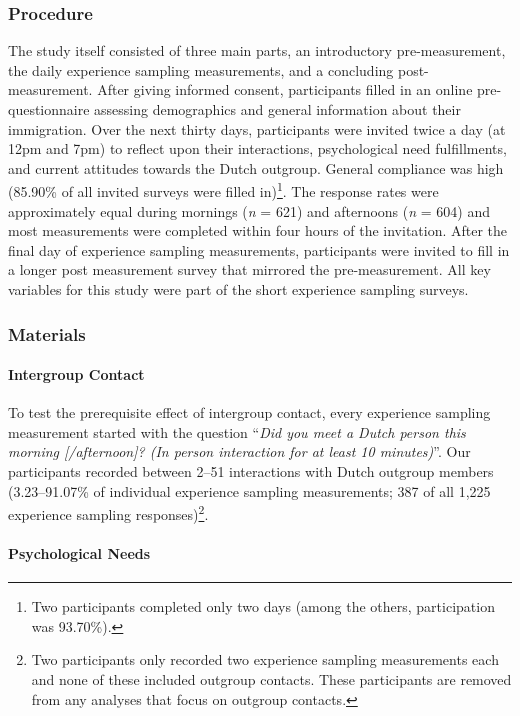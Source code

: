 \documentclass[man, 12pt, a4paper, mask]{apa7}
\theoremstyle{break}
\theoremstyle{plain}
\begin{document}
\subsubsection{Procedure}

The study itself consisted of three main parts, an introductory
pre-measurement, the daily experience sampling measurements, and a
concluding post-measurement. After giving informed consent, participants
filled in an online pre-questionnaire assessing demographics and general
information about their immigration. Over the next thirty days,
participants were invited twice a day (at 12pm and 7pm) to reflect upon
their interactions, psychological need fulfillments, and current
attitudes towards the Dutch outgroup. General compliance was high
(85.90\% of all invited surveys were filled
in)\footnote{Two participants completed only two days (among the others, participation was 93.70\%).}.
The response rates were approximately equal during mornings (\textit{n}
= 621) and afternoons (\textit{n} = 604) and most measurements were
completed within four hours of the invitation. After the final day of
experience sampling measurements, participants were invited to fill in a
longer post measurement survey that mirrored the pre-measurement. All
key variables for this study were part of the short experience sampling
surveys.

\subsubsection{Materials}

\paragraph{Intergroup Contact}

To test the prerequisite effect of intergroup contact, every experience
sampling measurement started with the question
``\textit{Did you meet a Dutch person this morning [/afternoon]? (In person interaction for at least 10 minutes)}''.
Our participants recorded between 2--51 interactions with Dutch outgroup
members (3.23--91.07\% of individual experience sampling measurements;
387 of all 1,225 experience sampling
responses)\footnote{Two participants only recorded two experience sampling measurements each and none of these included outgroup contacts. These participants are removed from any analyses that focus on outgroup contacts.}.

\paragraph{Psychological Needs}
\end{document}
